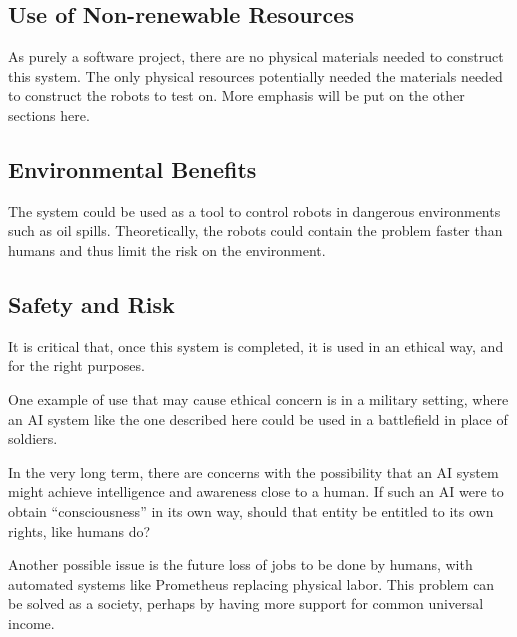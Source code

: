 \documentclass[titlepage,11pt]{article}
\begin{document}
\subsection{Use of Non-renewable Resources}

As purely a software project, there are no physical materials needed to construct this system. The only physical resources potentially needed the materials needed to construct the robots to test on. More emphasis will be put on the other sections here.

\subsection{Environmental Benefits}

The system could be used as a tool to control robots in dangerous environments such as oil spills. Theoretically, the robots could contain the problem faster than humans and thus limit the risk on the environment.

\subsection{Safety and Risk}

It is critical that, once this system is completed, it is used in an ethical way, and for the right purposes.


One example of use that may cause ethical concern is in a military setting, where an AI system like the one described here could be used in a battlefield in place of soldiers.

In the very long term, there are concerns with the possibility that an AI system might achieve intelligence and awareness close to a human. If such an AI were to obtain ``consciousness'' in its own way, should that entity be entitled to its own rights, like humans do?

Another possible issue is the future loss of jobs to be done by humans, with automated systems like Prometheus replacing physical labor. This problem can be solved as a society, perhaps by having more support for common universal income.
\end{document}
